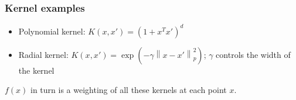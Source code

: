 \documentclass{article}
\newcommand{\norm}[2]{\left\lVert#1\right\rVert_#2}
\begin{document}
\subsubsection{Kernel examples}
\begin{itemize}
  \item Polynomial kernel: $K(x, x') = (1 + x^Tx')^d$
  \item Radial kernel: $K(x, x') = \exp(-\gamma\norm{x-x'}{p}^2)$; $\gamma$ controls the width of the kernel
\end{itemize}
$f(x)$ in turn is a weighting of all these kernels at each point $x$.
\end{document}
